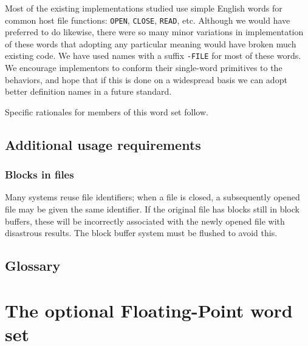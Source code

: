 Most of the existing implementations studied use simple English words
for common host file functions: \texttt{OPEN}, \texttt{CLOSE},
\texttt{READ}, etc.  Although we would have preferred to do likewise,
there were so many minor variations in implementation of these words
that adopting any particular meaning would have broken much existing
code.  We have used names with a suffix \texttt{-FILE} for most of these
words.  We encourage implementors to conform their single-word primitives
to the  behaviors, and hope that if this is done on a widespread
basis we can adopt better definition names in a future standard.

Specific rationales for members of this word set follow.

\setcounter{subsection}{2}
\subsection{Additional usage requirements} %

\setcounter{subsubsection}{1}
\subsubsection{Blocks in files} %

Many systems reuse file identifiers; when a file is closed, a
subsequently opened file may be given the same identifier. If the
original file has blocks still in block buffers, these will be
incorrectly associated with the newly opened file with disastrous
results. The block buffer system must be flushed to avoid this.

\setcounter{subsection}{5}
\subsection{Glossary} %



\section{The optional Floating-Point word set} %
\label{rat:floating}

